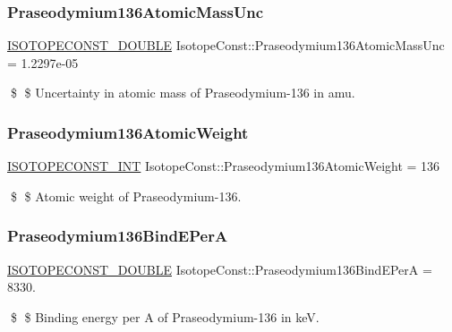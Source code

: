 \subsubsection{\texorpdfstring{Praseodymium136\+Atomic\+Mass\+Unc}{Praseodymium136AtomicMassUnc}}
{\footnotesize\ttfamily \mbox{\hyperlink{group___isotope_const-_macros_ga8f45a7272ce02c0b4c65c44636ed719a}{I\+S\+O\+T\+O\+P\+E\+C\+O\+N\+S\+T\+\_\+\+D\+O\+U\+B\+LE}} Isotope\+Const\+::\+Praseodymium136\+Atomic\+Mass\+Unc = 1.\+2297e-\/05}

\$ \$ Uncertainty in atomic mass of Praseodymium-\/136 in amu. \mbox{\label{group___isotope_const-_praseodymium-_pr136_ga14a6c5d4efa60b7a2025fa641602c772}} 
\subsubsection{\texorpdfstring{Praseodymium136\+Atomic\+Weight}{Praseodymium136AtomicWeight}}
{\footnotesize\ttfamily \mbox{\hyperlink{group___isotope_const-_macros_ga5f18360b3e99483a35c32d789e62621c}{I\+S\+O\+T\+O\+P\+E\+C\+O\+N\+S\+T\+\_\+\+I\+NT}} Isotope\+Const\+::\+Praseodymium136\+Atomic\+Weight = 136}

\$ \$ Atomic weight of Praseodymium-\/136. \mbox{\label{group___isotope_const-_praseodymium-_pr136_ga8f1c39bd330da78bb73bd01d20593700}} 
\subsubsection{\texorpdfstring{Praseodymium136\+Bind\+E\+PerA}{Praseodymium136BindEPerA}}
{\footnotesize\ttfamily \mbox{\hyperlink{group___isotope_const-_macros_ga8f45a7272ce02c0b4c65c44636ed719a}{I\+S\+O\+T\+O\+P\+E\+C\+O\+N\+S\+T\+\_\+\+D\+O\+U\+B\+LE}} Isotope\+Const\+::\+Praseodymium136\+Bind\+E\+PerA = 8330.}

\$ \$ Binding energy per A of Praseodymium-\/136 in keV. \mbox{\label{group___isotope_const-_praseodymium-_pr136_ga3fa0cb78da3289d6320f0f6908a26fbe}} 
